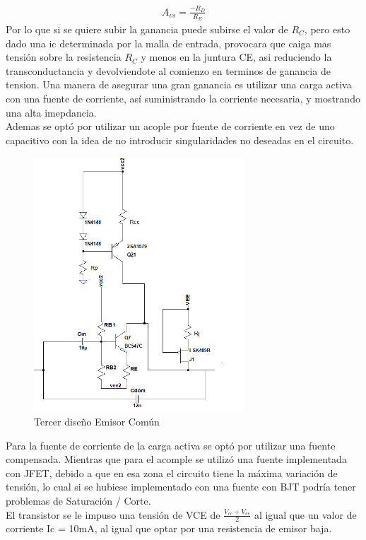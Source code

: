 \begin{align}
A_{vs}=\frac{-R_D}{R_E}
\end{align}
Por lo que si se quiere subir la ganancia puede subirse el valor de $R_C$, pero esto dado una ic determinada por la  malla de entrada, provocara que caiga mas tensión sobre la resistencia $R_C$ y menos en la juntura CE, asi reduciendo la transconductancia y devolviendote al comienzo en terminos de ganancia de tension. Una manera de asegurar una gran ganancia es utilizar una carga activa con una fuente de corriente, así suministrando la corriente necesaria, y mostrando una alta imepdancia. \\
Ademas se optó por utilizar un acople por fuente de corriente en vez de uno capacitivo con la idea de no introducir singularidades no deseadas en el circuito.
 \begin{figure}[H]
\centering
	\includegraphics[width=0.7\textwidth]{ImagenesGain-Stage/ec3.png}
	\caption{Tercer diseño Emisor Común}
	\label{fig:ec3}
\end{figure}
Para la fuente de corriente de la carga activa se optó por utilizar una fuente compensada. Mientras que para el acomple se utilizó una fuente implementada con JFET, debido a que en esa zona el circuito tiene la máxima variación de tensión, lo cual si se hubiese implementado con una fuente con BJT podría tener problemas de Saturación / Corte.\\
El transistor se le impuso una tensión de VCE de $\frac{V_{cc}+V_{ee}}{2}$ al igual que un valor de corriente Ic = 10mA, al igual que optar por una resistencia de emisor baja.\\

